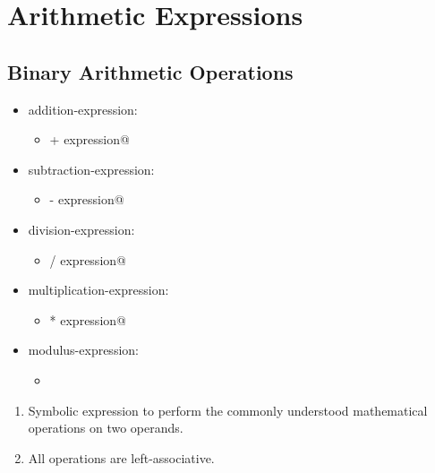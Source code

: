\section{Arithmetic Expressions}

\subsection{Binary Arithmetic Operations}
\begin{itemize}[before=\itshape, label={}]
	\item addition-expression:
	\begin{itemize}[before=\itshape, label={}]
		\item \lstinline@expression + expression@
	\end{itemize}
	\item subtraction-expression:
	\begin{itemize}[before=\itshape, label={}]
		\item \lstinline@expression - expression@
	\end{itemize}
	\item division-expression:
	\begin{itemize}[before=\itshape, label={}]
		\item \lstinline@expression / expression@
	\end{itemize}
	\item multiplication-expression:
	\begin{itemize}[before=\itshape, label={}]
		\item \lstinline@expression * expression@
	\end{itemize}
	\item modulus-expression:
	\begin{itemize}[before=\itshape, label={}]
		\item \lstinline@expression % expression@
	\end{itemize}
\end{itemize}
\begin{enumerate}
	\item Symbolic expression to perform the commonly understood mathematical operations on two operands.
	\item All operations are left-associative.
\end{enumerate}

